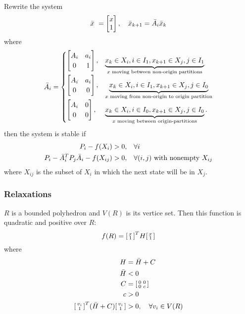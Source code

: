 Rewrite the system
%
\begin{equation}
  \bar{x} = \bmat{x \\ 1}, \quad \bar{x}_{k+1} = \bar{A}_i \bar{x}_k
\end{equation}
%
where
%
\begin{equation}
  \bar{A}_i =
  \begin{cases}
    \begin{bmatrix} A_i & a_i \\ 0 & 1 \end{bmatrix},&
    \underbrace{x_k \in X_i, i \in I_1, x_{k+1} \in X_j, j \in I_1}
              _{x \text{ moving between non-origin partitions}} \\
    \begin{bmatrix} A_i & a_i \\ 0 & 0 \end{bmatrix},&
    \underbrace{x_k \in X_i, i \in I_1, x_{k+1} \in X_j, j \in I_0}
              _{x \text{ moving from non-origin to origin partition}} \\
    \begin{bmatrix} A_i & 0 \\ 0 & 0 \end{bmatrix},&
    \underbrace{x_k \in X_i, i \in I_0, x_{k+1} \in X_j, j \in I_0}
              _{x \text{ moving between origin-partitions}}.
  \end{cases}
\end{equation}
%
then the system is stable if
%
\begin{equation}
  \begin{split}
    P_i - f(X_i) > 0,\quad & \forall i \\
    P_i - \bar{A}_i^{T} P_j \bar{A}_i - f(X_{ij}) > 0,\quad & \forall (i,j) \mbox{ with nonempty } X_{ij}
  \end{split}
\end{equation}
%
where $X_{ij}$ is the subset of $X_i$ in which the next state will be in $X_j$.

\subsubsection{Relaxations}
$R$ is a bounded polyhedron and $V(R)$ is its vertice set. Then this function is quadratic and positive over $R$:
\begin{equation}
  f(R) = \begin{bsmallmatrix} x \\ 1 \end{bsmallmatrix}^{T} H \begin{bsmallmatrix} x \\ 1 \end{bsmallmatrix}
\end{equation}
%
where
%
\begin{equation}
  \begin{split}
    H &= \bar{H} + C \\
    \bar{H} &< 0 \\
    C &= \begin{bsmallmatrix} 0 & 0 \\ 0 & c \end{bsmallmatrix} \\
    c &> 0 \\
    \begin{bsmallmatrix} v_i \\ 1 \end{bsmallmatrix}^{T} (\bar{H} + C) \begin{bsmallmatrix} v_i \\ 1 \end{bsmallmatrix} &> 0,\quad \forall v_i \in V(R)
  \end{split}
\end{equation}
